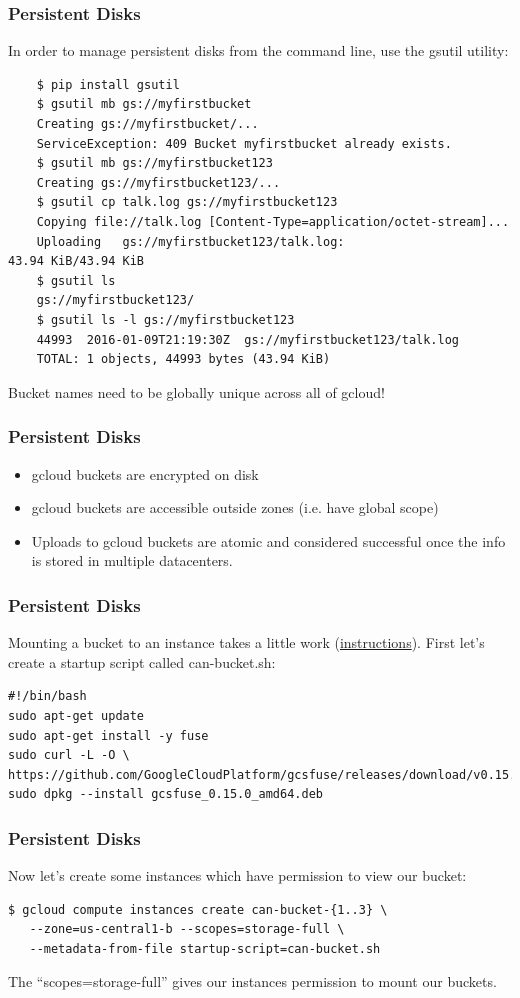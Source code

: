 \documentclass[9pt]{beamer}
\begin{document}
\begin{frame}[fragile]
  \frametitle{Persistent Disks}
  In order to manage persistent disks from the command line, use the gsutil utility:
  \begin{verbatim}
    $ pip install gsutil
    $ gsutil mb gs://myfirstbucket
    Creating gs://myfirstbucket/...
    ServiceException: 409 Bucket myfirstbucket already exists.
    $ gsutil mb gs://myfirstbucket123
    Creating gs://myfirstbucket123/...
    $ gsutil cp talk.log gs://myfirstbucket123
    Copying file://talk.log [Content-Type=application/octet-stream]...
    Uploading   gs://myfirstbucket123/talk.log:                      43.94 KiB/43.94 KiB
    $ gsutil ls
    gs://myfirstbucket123/
    $ gsutil ls -l gs://myfirstbucket123
    44993  2016-01-09T21:19:30Z  gs://myfirstbucket123/talk.log
    TOTAL: 1 objects, 44993 bytes (43.94 KiB)
  \end{verbatim}
  Bucket names need to be globally unique across all of gcloud!
\end{frame}

\begin{frame}[fragile]
  \frametitle{Persistent Disks}
  \begin{itemize}
  \item gcloud buckets are encrypted on disk
  \item gcloud buckets are accessible outside zones (i.e. have global scope)
  \item Uploads to gcloud buckets are atomic and considered successful once the info is stored in multiple datacenters.
  \end{itemize}
\end{frame}

\begin{frame}[fragile]
\frametitle{Persistent Disks}
Mounting a bucket to an instance takes a little work (\href{https://github.com/googlecloudplatform/gcsfuse/blob/master/docs/installing.md}{instructions}). First let's create a startup script called can-bucket.sh:
\begin{verbatim}
#!/bin/bash
sudo apt-get update
sudo apt-get install -y fuse
sudo curl -L -O \
https://github.com/GoogleCloudPlatform/gcsfuse/releases/download/v0.15.0/gcsfuse_0.15.0_amd64.deb
sudo dpkg --install gcsfuse_0.15.0_amd64.deb
\end{verbatim}
\end{frame}
\begin{frame}[fragile]
\frametitle{Persistent Disks}
Now let's create some instances which have permission to view our bucket:
\begin{verbatim}
$ gcloud compute instances create can-bucket-{1..3} \
   --zone=us-central1-b --scopes=storage-full \
   --metadata-from-file startup-script=can-bucket.sh
\end{verbatim}
The ``scopes=storage-full'' gives our instances permission to mount our buckets.
\end{frame}
\end{document}
